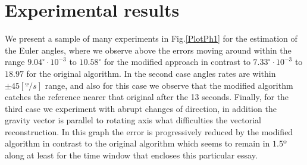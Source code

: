 \documentclass[10pt,conference]{IEEEtran}
\begin{document}
\section{Experimental results}\label{experimentation}
We present a sample of many experiments in Fig.\ref{PlotPh1} for the estimation of the Euler angles, where we observe above the errors moving around within the range $9.04^{\circ}\cdot10^{-3}$ to $10.58^{\circ}$ for the modified approach in contrast to $7.33^{\circ}\cdot10^{-3}$ to $18.97$ for the original  algorithm. In the second case angles rates are within $\pm45[º/s]$ range, and also for this case we observe that the modified algorithm catches the reference nearer that original  after the 13 seconds. Finally, for the third case we experiment with abrupt changes of direction, in addition the gravity vector is parallel to rotating axis what difficulties the vectorial reconstruction. In this graph the error is progressively reduced by the modified algorithm in contrast to the original algorithm which seems to remain in $1.5º$ along at least for the time window that encloses this particular essay.\par
\end{document}
